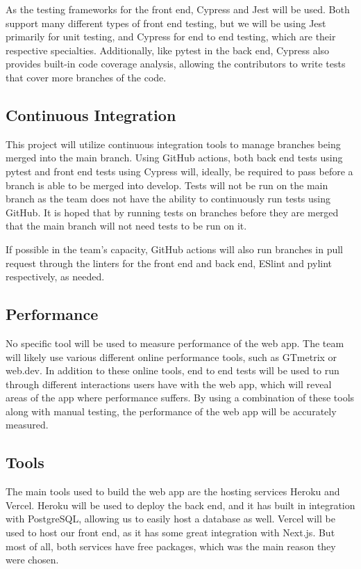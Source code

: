 \documentclass{article}
\begin{document}
As the testing frameworks for the front end, Cypress and Jest will be used. Both support many different types of front end testing, but we will be using Jest primarily for unit testing, and Cypress for end to end testing, which are their respective specialties. Additionally, like pytest in the back end, Cypress also provides built-in code coverage analysis, allowing the contributors to write tests that cover more branches of the code. 

\subsection{Continuous Integration}

This project will utilize continuous integration tools to manage branches being merged into the main branch. Using GitHub actions, both back end tests using pytest and front end tests using Cypress will, ideally, be required to pass before a branch is able to be merged into develop. Tests will not be run on the main branch as the team does not have the ability to continuously run tests using GitHub. It is hoped that by running tests on branches before they are merged that the main branch will not need tests to be run on it.

If possible in the team's capacity, GitHub actions will also run branches in pull request through the linters for the front end and back end, ESlint and pylint respectively, as needed.

\subsection{Performance}

No specific tool will be used to measure performance of the web app. The team will likely use various different online performance tools, such as GTmetrix or web.dev. In addition to these online tools, end to end tests will be used to run through different interactions users have with the web app, which will reveal areas of the app where performance suffers. By using a combination of these tools along with manual testing, the performance of the web app will be accurately measured.

\subsection{Tools}

The main tools used to build the web app are the hosting services Heroku and Vercel. Heroku will be used to deploy the back end, and it has built in integration with PostgreSQL, allowing us to easily host a database as well. Vercel will be used to host our front end, as it has some great integration with Next.js. But most of all, both services have free packages, which was the main reason they were chosen.
\end{document}
